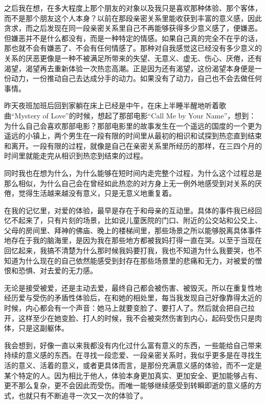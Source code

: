 之后我在想，在多大程度上那个朋友的对象以及我只是喜欢那种体验、那个客体，而不是那个朋友这个人本身？以前在那段亲密关系里能收获到丰富的意义感，因此贪求，而之后发现在同一段亲密关系里自己不再能够获得多少意义感了，便嫌恶。但嫌恶并不是什么都没有，而是一种特定的情感。如果自己真的完全不在乎的话，那也就不会有嫌恶了、不会有任何情感了。那种对自我感觉这已经没有多少意义的关系的厌恶更像是一种不被满足所带来的失望、无意义、虚无、伤心、厌倦，还有渴望，渴望再去重新体验一次热恋高潮。正是因为还有渴望，这份渴望本身便是一份动力，一份推动自己去达成分手的动力。如果没有了动力，自己也不会去做任何事情。

昨天夜班加班后回到家躺在床上已经是中午，在床上半睡半醒地听着歌曲“Mystery of Love”的时候，想起了那部电影“Call Me by Your Name”，想到：为什么自己会喜欢那部电影？那部电影里的故事发生在一个遥远的国度的一个更为遥远的小镇上，两个男生在一段有限的时间里从最初的相识和试探到热恋直到结束和离开。一段有限的过程，就像是自己在亲密关系里所经历的那样，在三四个月的时间里就能走完从相识到热恋到结束的过程。

同时我也在想为什么，为什么能够在短时间内走完整个过程，为什么这个过程总是那么相似，为什么自己会在曾经如此热恋的对方身上无一例外地感受到对关系的厌倦，觉得生活越来越没有意义，只是无意义地重复着。

在我的记忆里，对爱的体验，最早是存在于和母亲的互动里。具体的事件我已经回忆不起来了，只有片刻的场景，比如说儿童医院的门口、附近的公交站和公交上、父母的房间里、拜神的佛庙、晚上的楼梯间里，那些场景之所以能够脱离具体事件地存在于我的脑海里，是因为我在那些地方都被我妈打得一直在哭。以至于当现在回忆起来，我搞不清楚为什么那时候我妈要打我，我也不知道为什么我要哭，也不知道为什么现在的自己依然能感受到封存在那些场景里的悲痛和无力，对被爱的憎恨和恐惧、对去爱的无力感。

无论是接受被爱，还是主动去爱，最终自己都会被伤害、被毁灭。所以在重复性地经历爱与受伤的矛盾性体验后，在和她的相处里，每当我发现自己好像靠得太近的时候，内心都会有一个声音：她马上就要变脸了、要打人了。然后就会把自己拉开，这样至少在她变脸、打人的时候，我不会被突然伤害到内心，起码受伤只是肉体，只是这副躯体。

我会想到，好像一直以来我都没有内化过什么富有意义的东西，一些能给自己带来持续的意义感的东西。在寻找一段恋爱、一段亲密关系时，我似乎更多是在寻找生活的意义、活着的意义，或者更具体而言，是那份充满意义感的体验，而不一定是某个特定的人。因为相比于他人，体验本身更加真实、更加安全、更加能够占有、更不那么复杂，更不会因此而受伤。而唯一能够继续感受到转瞬即逝的意义感的方式，也就只有不断追寻一次又一次的体验了。

